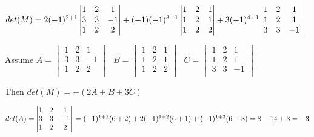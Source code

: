 \documentclass[fleqn]{article}
\begin{document}
\begin{enumerate}
      \textcolor{hwColor}{
        $
          det(M)= \\
          2(-1)^{2+1}
          \begin{vmatrix}
            1 & 2 & 1 \\ 
            3 & 3 & -1 \\
            1 & 2 & 2 \\
          \end{vmatrix}+
          (-1)(-1)^{3+1} 
          \begin{vmatrix}
            1 & 2 & 1 \\ 
            1 & 2 & 1 \\
            1 & 2 & 2 \\
          \end{vmatrix}+
          3(-1)^{4+1}
          \begin{vmatrix}
            1 & 2 & 1 \\ 
            1 & 2 & 1 \\
            3 & 3 & -1 \\
         \end{vmatrix}
        $
      }

      \textcolor{hwColor}{
        Assume 
        $
          A=\begin{vmatrix}
            1 & 2 & 1 \\ 
            3 & 3 & -1 \\
            1 & 2 & 2 \\
          \end{vmatrix} ~~~
          B=\begin{vmatrix}
            1 & 2 & 1 \\ 
            1 & 2 & 1 \\
            1 & 2 & 2 \\
          \end{vmatrix} ~~~
          C=\begin{vmatrix}
            1 & 2 & 1 \\ 
            1 & 2 & 1 \\
            3 & 3 & -1 \\
         \end{vmatrix}
        $
      }

      \bigbreak

      \textcolor{hwColor}{
        Then
        $det(M)=-(2A+B+3C)$
      }

      \bigbreak

      \textcolor{hwColor}{
        $
          det(A)=\begin{vmatrix}
            1 & 2 & 1 \\ 
            3 & 3 & -1 \\
            1 & 2 & 2 \\
          \end{vmatrix} \\
          =(-1)^{1+1}(6+2)+2(-1)^{1+2}(6+1)+(-1)^{1+3}(6-3)=8-14+3=-3
        $
      }


\end{enumerate}
\end{document}
